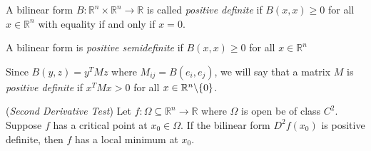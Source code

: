 \documentclass[11pt]{article}
\theoremstyle{definition}
\newcommand{\R}{\mathbb{R}}                      %
\newcommand{\bslash}{\symbol{92}}
\begin{document}
\begin{mdframed}[backgroundcolor = blue!10]
\vspace{+0.1cm}

 A bilinear form $B:\R^n\times\R^n\to \R$ is called \textit{positive definite} if $B(x,x)\geq 0$ for all $x\in \R^n$ with equality if and only if $x=0$.

 A bilinear form is \textit{positive semidefinite} if $B(x,x)\geq 0$ for all $x\in\R^n$

\end{mdframed}

\note Since $B(y,z)=y^T Mz$ where $M_{ij}=B(e_i,e_j)$, we will say that a matrix $M$ is \textit{positive definite} if $x^TMx >0$ for all $x\in\R^n\bslash\{0\}$.

\prop (\textit{Second Derivative Test}) Let $f:\Omega\subseteq \R^n\to\R$ where $\Omega$ is open be of class $C^2$. Suppose $f$ has a critical point at $x_0\in\Omega$. If the bilinear form $D^2f(x_0)$ is positive definite, then $f$ has a local minimum at $x_0$. 
\end{document}

